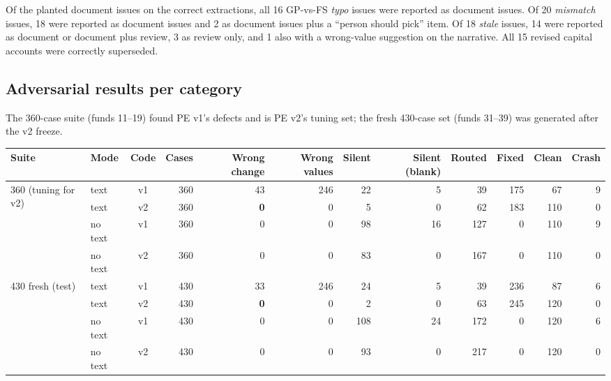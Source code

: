 Of the planted document issues on the correct extractions, all 16 GP-vs-FS \emph{typo} issues were reported as document issues. Of 20 \emph{mismatch} issues, 18 were reported as document issues and 2 as document issues plus a ``person should pick'' item. Of 18 \emph{stale} issues, 14 were reported as document or document plus review, 3 as review only, and 1 also with a wrong-value suggestion on the narrative. All 15 revised capital accounts were correctly superseded.

\subsection{Adversarial results per category}\label{app:adv}

\label{tab:adv}
The 360-case suite (funds 11--19) found PE v1's defects and is PE v2's tuning set; the fresh 430-case set (funds 31--39) was generated after the v2 freeze.
\begin{center}\footnotesize\setlength{\tabcolsep}{3pt}
\begin{tabular}{llcrrrrrrrrr}
\toprule
Suite & Mode & Code & Cases & Wrong change & Wrong values & Silent & Silent (blank) & Routed & Fixed & Clean & Crash \\
\midrule
\multirow{4}{*}{360 (tuning for v2)} & text & v1 & 360 & 43 & 246 & 22 & 5 & 39 & 175 & 67 & 9 \\
 & text & v2 & 360 & \textbf{0} & 0 & 5 & 0 & 62 & 183 & 110 & 0 \\
 & no text & v1 & 360 & 0 & 0 & 98 & 16 & 127 & 0 & 110 & 9 \\
 & no text & v2 & 360 & 0 & 0 & 83 & 0 & 167 & 0 & 110 & 0 \\
\midrule
\multirow{4}{*}{430 fresh (test)} & text & v1 & 430 & 33 & 246 & 24 & 5 & 39 & 236 & 87 & 6 \\
 & text & v2 & 430 & \textbf{0} & 0 & 2 & 0 & 63 & 245 & 120 & 0 \\
 & no text & v1 & 430 & 0 & 0 & 108 & 24 & 172 & 0 & 120 & 6 \\
 & no text & v2 & 430 & 0 & 0 & 93 & 0 & 217 & 0 & 120 & 0 \\
\bottomrule
\end{tabular}
\end{center}


